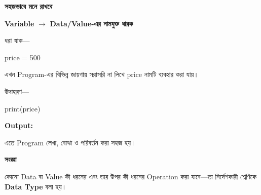 \begin{rememberbox}

\textbf{\color{deepOrange}সহজভাবে মনে রাখবে}

\begin{center}

\textbf{Variable}
\(\longrightarrow\)
\textbf{Data/Value-এর নামযুক্ত ধারক}

\end{center}

\end{rememberbox}



ধরা যাক—

\begin{codebox}

\begin{english}
\ttfamily
price = 500
\end{english}

\end{codebox}

এখন Program-এর বিভিন্ন জায়গায় সরাসরি
\textenglish{}
না লিখে
\textenglish{\ttfamily price}
নামটি ব্যবহার করা যায়।

উদাহরণ—

\begin{codebox}

\begin{english}
\ttfamily
print(price)
\end{english}

\end{codebox}

\textbf{Output:}

\begin{codebox}

\begin{english}
\end{english}

\end{codebox}

এতে Program লেখা, বোঝা ও পরিবর্তন করা সহজ হয়।



\begin{definitionbox}

\textbf{\color{darkTeal}সংজ্ঞা}

কোনো Data বা Value কী ধরনের এবং তার উপর কী ধরনের
Operation করা যাবে—তা নির্দেশকারী শ্রেণিকে
\textbf{Data Type} বলা হয়।

\end{definitionbox}

